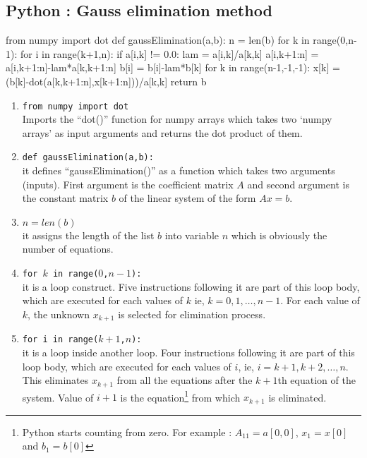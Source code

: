 \subsection{Python : Gauss elimination method}
\begin{program}
	\begin{python}
	from numpy import dot
	def gaussElimination(a,b):
		n = len(b)
		for k in range(0,n-1):
			for i in range(k+1,n):
				if a[i,k] != 0.0:
					lam = a[i,k]/a[k,k]
					a[i,k+1:n] = a[i,k+1:n]-lam*a[k,k+1:n]
					b[i] = b[i]-lam*b[k]
		for k in range(n-1,-1,-1):
			x[k] = (b[k]-dot(a[k,k+1:n],x[k+1:n]))/a[k,k]
		return b
	\end{python}
\end{program}

\begin{commentary}
\begin{enumerate}[label=Line \arabic*]
	\item \texttt{from numpy import dot} \\ Imports the ``dot()'' function for numpy arrays which takes two `numpy arrays' as input arguments and returns the dot product of them.
	\item \texttt{def gaussElimination(a,b):}\\ it defines ``gaussElimination()'' as a function which takes two arguments (inputs).
		First argument is the coefficient matrix $A$ and second argument is the constant matrix $b$ of the linear system of the form $Ax = b$.
	\item \texttt{$n = len(b)$}\\ it assigns the length of the list $b$ into variable $n$ which is obviously the number of equations.
	\item \texttt{for $k$ in range($0$,$n-1$):}  \\ it is a loop construct.
		Five instructions following it are part of this loop body, which are executed for each values of $k$ ie, $k = 0, 1, \dots, n-1$.
		For each value of $k$, the unknown $x_{k+1}$ is selected for elimination process.
	\item \texttt{for i in range($k+1$,$n$):}\\ it is a loop inside another loop.
		Four instructions following it are part of this loop body, which are executed for each values of $i$, ie, $i = k+1, k+2, \dots, n$.
		This eliminates $x_{k+1}$ from all the equations after the $k+1$th equation of the system.
		Value of $i+1$ is the equation\footnote{Python starts counting from zero.
		For example : $A_{11} = a[0,0]$, $x_1 = x[0]$ and $b_1 = b[0]$} from which $x_{k+1}$ is eliminated.

\end{enumerate}
\end{commentary}
